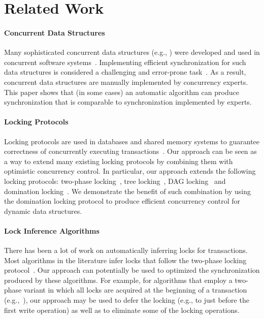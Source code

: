 \section{Related Work}\label{sec:related}
\paragraph{Concurrent Data Structures}
Many sophisticated concurrent data structures (e.g., \cite{ArbelA2014,DrachslerVY2014,NatarajanM2014,BrownER2014,CrainGR2013,BraginskyP2012,
AfekKKMT2012,EllenFRB2010,BronsonCCO2010,HerlihyLLS2007,fraser2004practical,Michael:1996})
were developed and used in concurrent software systems~\cite{Ohad:OOPSLA11}.
Implementing efficient synchronization for such data structures is considered a challenging and error-prone task~\cite{Ohad:OOPSLA11,Doh:SPAA04,Jin:2012}.
As a result, concurrent data structures are manually implemented by concurrency experts.
This paper shows that (in some cases) an automatic algorithm can produce synchronization that is comparable to synchronization implemented by experts.

\paragraph{Locking Protocols}
Locking protocols are used in databases and shared memory systems to guarantee correctness
of concurrently executing transactions~\cite{Weikum:2001,BHG:Book87}.
Our approach can be seen as a way to extend many existing locking protocols by combining them with  optimistic concurrency control.
In particular, our approach extends the following locking protocols:
two-phase locking~\cite{Eswaran:1976}, tree locking~\cite{SilberschatzK1980}, DAG locking~\cite{CH:PODS95} and domination locking~\cite{Gueta2011}.
We demonstrate the benefit of such combination by using the  domination locking protocol to produce efficient concurrency control for
dynamic data structures.


\paragraph{Lock Inference Algorithms}
There has been a lot of work on automatically inferring locks for transactions.
Most   algorithms in the literature infer locks that follow the two-phase
locking protocol~\cite{MZGB:POPL06,Emmi06POPL,gudka2012lock,CCG:PLDI08,HFP:TRANSACT06,CGE:CC08}.
Our approach can potentially be used to optimized the synchronization produced by these algorithms.
For example, for  algorithms that employ a two-phase variant in which all locks are acquired at the beginning of a transaction (e.g.,~\cite{gudka2012lock,CCG:PLDI08}),
our approach may be used to defer the locking (e.g., to just before the first write operation) as well as to eliminate some of the locking operations.


